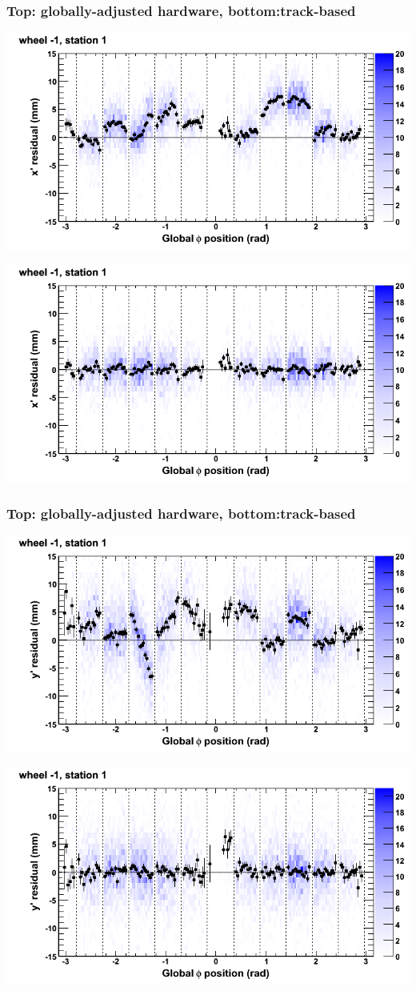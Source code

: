 \documentclass[compress]{beamer}
\begin{document}
\begin{frame}
\frametitle{Top: globally-adjusted hardware, bottom:track-based}
\includegraphics[width=0.7\linewidth]{NOV4_mapplots_HW/DTvsphi_st1whB_x.png}

\includegraphics[width=0.7\linewidth]{NOV4_mapplots/DTvsphi_st1whB_x.png}
\end{frame}

\begin{frame}
\frametitle{Top: globally-adjusted hardware, bottom:track-based}
\includegraphics[width=0.7\linewidth]{NOV4_mapplots_HW/DTvsphi_st1whB_y.png}

\includegraphics[width=0.7\linewidth]{NOV4_mapplots/DTvsphi_st1whB_y.png}
\end{frame}
\end{document}
